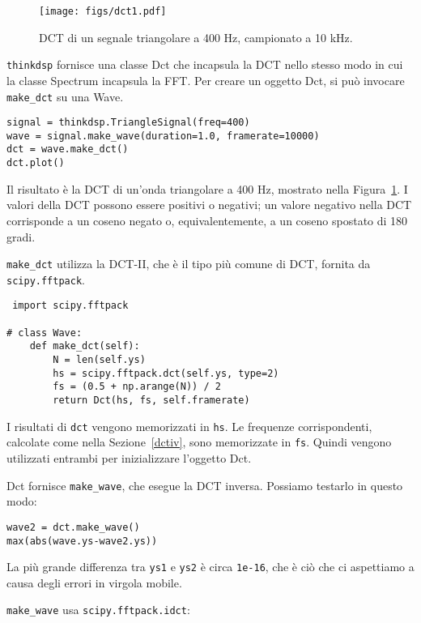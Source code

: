 \documentclass[12pt,a4paper]{book}
\begin{document}
\begin{figure} 

\centerline{\texttt{[image: figs/dct1.pdf]}} \caption{DCT di un segnale triangolare a 400 Hz, campionato a 10 kHz.} \label{fig.dct1} \end{figure} 

{\tt thinkdsp} fornisce una classe Dct che incapsula la DCT nello stesso modo in cui la classe Spectrum incapsula la FFT. Per creare un oggetto Dct, si può invocare \verb"make_dct" su una Wave.

\begin{verbatim} 
signal = thinkdsp.TriangleSignal(freq=400)
wave = signal.make_wave(duration=1.0, framerate=10000)
dct = wave.make_dct()
dct.plot()
 \end{verbatim} 

Il risultato è la DCT di un'onda triangolare a 400 Hz, mostrato nella Figura~\ref{fig.dct1}. I valori della DCT possono essere positivi o negativi; un valore negativo nella DCT corrisponde a un coseno negato o, equivalentemente, a un coseno spostato di 180 gradi.

\verb"make_dct" utilizza la DCT-II, che è il tipo più comune di DCT, fornita da {\tt scipy.fftpack}.

\begin{verbatim} import scipy.fftpack

# class Wave:
    def make_dct(self):
        N = len(self.ys)
        hs = scipy.fftpack.dct(self.ys, type=2)
        fs = (0.5 + np.arange(N)) / 2
        return Dct(hs, fs, self.framerate)
 \end{verbatim} 

I risultati di {\tt dct} vengono memorizzati in {\tt hs}. Le frequenze corrispondenti, calcolate come nella Sezione~\ref{dctiv}, sono memorizzate in {\tt fs}. Quindi vengono utilizzati entrambi per inizializzare l'oggetto Dct.

Dct fornisce \verb"make_wave", che esegue la DCT inversa. Possiamo testarlo in questo modo:

\begin{verbatim} 
wave2 = dct.make_wave()
max(abs(wave.ys-wave2.ys))
 \end{verbatim} 

La più grande differenza tra {\tt ys1} e {\tt ys2} è circa {\tt 1e-16}, che è ciò che ci aspettiamo a causa degli errori in virgola mobile.

\verb"make_wave" usa {\tt scipy.fftpack.idct}:
\end{document}
